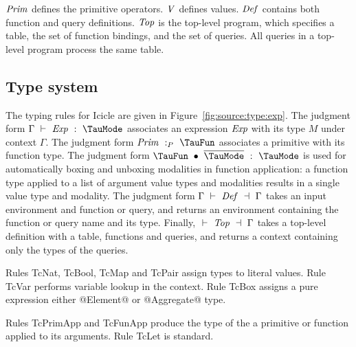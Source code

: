 $\mathit{Prim}$ defines the primitive operators.
$\mathit{V}$ defines values.
$\mathit{Def}$ contains both function and query definitions.
$\mathit{Top}$ is the top-level program, which specifies a table, the set of function bindings, and the set of queries.
All queries in a top-level program process the same table.


\subsection{Type system}
The typing rules for Icicle are given in Figure~\ref{fig:source:type:exp}.
The judgment form $\Typecheck{\Gamma}{\mi{Exp}}{\TauMode}$ associates an expression $\mathit{Exp}$ with its type $M$ under context $\Gamma$.
The judgment form $\TypecheckP{\mi{Prim}}{\TauFun}$ associates a primitive with its function type.
The judgment form $\TypecheckApp{\TauFun}{\ov{\TauMode}}{\TauMode}$ is used for automatically boxing and unboxing modalities in function application: a function type applied to a list of argument value types and modalities results in a single value type and modality.
The judgment form $\TypecheckS{\Gamma}{\mi{Def}}{\Gamma}$ takes an input environment and function or query, and returns an environment containing the function or query name and its type.
Finally, $\TypecheckS{}{\mi{Top}}{\Gamma}$ takes a top-level definition with a table, functions and queries, and returns a context containing only the types of the queries.

Rules TcNat, TcBool, TcMap and TcPair assign types to literal values.
Rule TcVar performs variable lookup in the context.
Rule TcBox assigns a pure expression either @Element@ or @Aggregate@ type. 


Rules TcPrimApp and TcFunApp produce the type of the a primitive or function applied to its arguments. Rule TcLet is standard.


